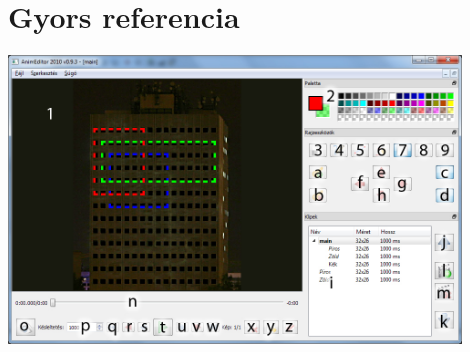 \documentclass[a4paper,12pt,release]{article}
\begin{document}
\section{Gyors referencia}
\includegraphics[width=0.9\textwidth]{pics/main.jpg}\\
\end{document}
